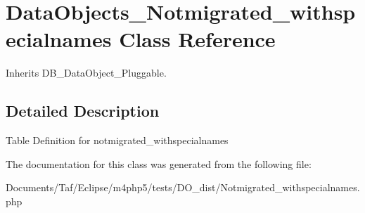 \hypertarget{classDataObjects__Notmigrated__withspecialnames}{
\section{DataObjects\_\-Notmigrated\_\-withspecialnames Class Reference}
\label{classDataObjects__Notmigrated__withspecialnames}
}
Inherits DB\_\-DataObject\_\-Pluggable.



\subsection{Detailed Description}
Table Definition for notmigrated\_\-withspecialnames 

The documentation for this class was generated from the following file:\begin{CompactItemize}
\item 
Documents/Taf/Eclipse/m4php5/tests/DO\_\-dist/Notmigrated\_\-withspecialnames.php\end{CompactItemize}
